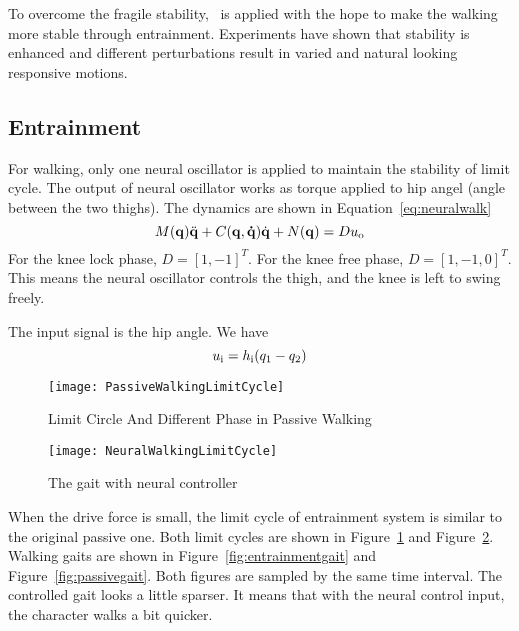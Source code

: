 To overcome the fragile stability, \cpg\ is applied with the hope to make the walking more stable through entrainment.
Experiments have shown that stability is enhanced and different perturbations result in varied and natural looking responsive motions.




\subsection{Entrainment}
For walking, only one neural oscillator is applied to maintain the stability of limit cycle.
The output of neural oscillator works as torque applied to hip angel (angle between the two thighs).
The dynamics are shown in Equation~\ref{eq:neuralwalk}
\begin{equation}
\label{eq:neuralwalk}
M(\mathbf{q}) \ddot{\mathbf{q}} + C(\mathbf{q,\dot{q}})\dot{\mathbf{q}} + N(\mathbf{q}) = Du_{\mathrm{o}}
\end{equation}
For the knee lock phase, $D=[1,-1]^T$.
For the knee free phase, $D=[1,-1,0]^T$.
This means the neural oscillator controls the thigh, and the knee is left to swing freely.

The input signal is the hip angle.
We have 
\[
	u_{\mathrm{i}}=h_{\mathrm{i}}(q_1-q_2)
\]





\begin{figure}[!htbp]
  \begin{center}
    \texttt{[image: PassiveWalkingLimitCycle]}
    \caption{Limit Circle And Different Phase in Passive Walking}
    \label{fig:passivegaitlimitcycle}
\end{center}
\end{figure}


\begin{figure}[!htbp]
  \begin{center}
      \texttt{[image: NeuralWalkingLimitCycle]}
    \caption{The gait with neural controller}
    \label{fig:entrainmentgaitlimitcyle}
\end{center}
\end{figure}
When the drive force is small, the limit cycle of entrainment system is similar to the original passive one.
Both limit cycles are shown in Figure~\ref{fig:passivegaitlimitcycle} and Figure~\ref{fig:entrainmentgaitlimitcyle}.
Walking gaits are shown in Figure~\ref{fig:entrainmentgait} and Figure~\ref{fig:passivegait}.
Both figures are sampled by the same time interval.
The controlled gait looks a little sparser.
It means that with the neural control input, the character walks a bit quicker. 




